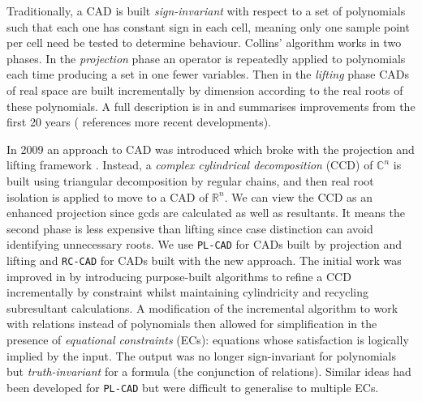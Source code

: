 \documentclass[runningheads,a4paper]{llncs}
\begin{document}
\vspace*{10pt}

Traditionally, a CAD is built \textit{sign-invariant} with respect to a set of polynomials such that each one has constant sign in each cell, meaning only one sample point per cell need be tested to determine behaviour.  Collins' algorithm works in two phases.  In the \textit{projection} phase an operator is repeatedly applied to polynomials each time producing a set in one fewer variables.  Then in the \textit{lifting} phase CADs of real space are built incrementally by dimension according to the real roots of these polynomials.
A full description is in \cite{ACM84I} and \cite{Collins1998} summarises improvements from the first 20 years (\cite{BDEMW13} references more recent developments).

In 2009 an approach to CAD was introduced which broke with the projection and lifting framework \cite{CMXY09}.  Instead, a \emph{complex cylindrical decomposition} (CCD) of $\mathbb{C}^n$ is built using triangular decomposition by regular chains, and then real root isolation is applied to move to a CAD of $\mathbb{R}^n$.  
We can view the CCD as an enhanced projection since gcds are calculated as well as resultants. It means the second phase is less expensive than lifting since case distinction can avoid identifying unnecessary roots.
We use \texttt{PL-CAD} for CADs built by projection and lifting and \texttt{RC-CAD} for CADs built with the new approach.
The initial work was improved in \cite{CM12b} by introducing purpose-built algorithms to refine a CCD incrementally by constraint whilst maintaining cylindricity and recycling subresultant calculations.  
A modification of the incremental algorithm to work with relations instead of polynomials then allowed for simplification in the presence of \emph{equational constraints} (ECs): equations whose satisfaction is logically implied by the input.  
The output was no longer sign-invariant for polynomials but \textit{truth-invariant} for a formula (the conjunction of relations).  Similar ideas had been developed for \texttt{PL-CAD} \cite{McCallum1999} but were difficult to generalise to multiple ECs.
\end{document}
